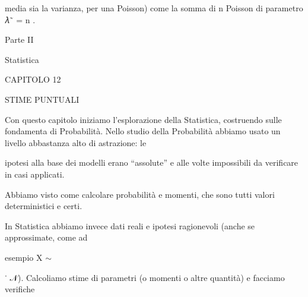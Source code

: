 \documentclass[a4paper,portrait,12pt]{article}
\begin{document}
\begin{flushleft}
media sia la varianza, per una Poisson) come la somma di n Poisson di parametro 𝜆˜ = n .
\end{flushleft}





\begin{flushleft}
\newpage
Parte II
\end{flushleft}


\begin{flushleft}
Statistica
\end{flushleft}





\begin{flushleft}
\newpage
\newpage
CAPITOLO 12
\end{flushleft}


\begin{flushleft}
STIME PUNTUALI
\end{flushleft}


\begin{flushleft}
Con questo capitolo iniziamo l'esplorazione della Statistica, costruendo sulle fondamenta di Probabilit\`{a}. Nello studio della Probabilit\`{a} abbiamo usato un livello abbastanza alto di astrazione: le
\end{flushleft}


\begin{flushleft}
ipotesi alla base dei modelli erano {``}assolute'' e alle volte impossibili da verificare in casi applicati.
\end{flushleft}


\begin{flushleft}
Abbiamo visto come calcolare probabilit\`{a} e momenti, che sono tutti valori deterministici e certi.
\end{flushleft}


\begin{flushleft}
In Statistica abbiamo invece dati reali e ipotesi ragionevoli (anche se approssimate, come ad
\end{flushleft}


\begin{flushleft}
esempio X $\sim$
\end{flushleft}


\begin{flushleft}
˙ 𝒩). Calcoliamo stime di parametri (o momenti o altre quantit\`{a}) e facciamo verifiche
\end{flushleft}
\end{document}
